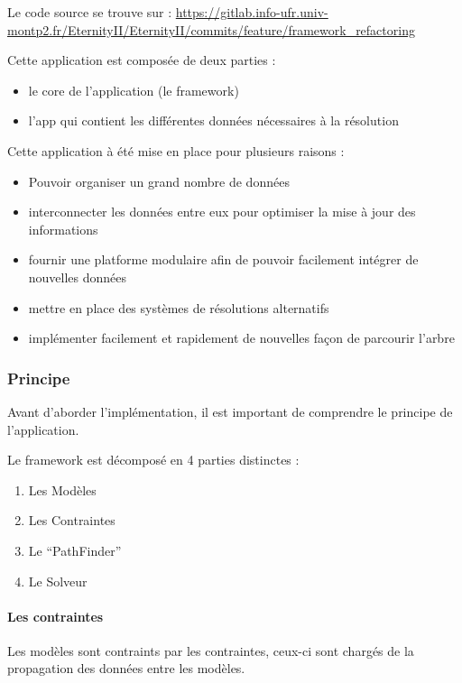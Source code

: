 Le code source se trouve sur : \url{https://gitlab.info-ufr.univ-montp2.fr/EternityII/EternityII/commits/feature/framework_refactoring}

Cette application est composée de deux parties :

\begin{itemize}
	\item le core de l'application (le framework)
	\item l'app qui contient les différentes données nécessaires à la résolution
\end{itemize}

Cette application à été mise en place pour plusieurs raisons :
\begin{itemize}
	\item Pouvoir organiser un grand nombre de données
	\item interconnecter les données entre eux pour optimiser la mise à jour des informations
	\item fournir une platforme modulaire afin de pouvoir facilement intégrer de nouvelles données
	\item mettre en place des systèmes de résolutions alternatifs
	\item implémenter facilement et rapidement de nouvelles façon de parcourir l'arbre
\end{itemize}

\subsubsection{Principe}

Avant d'aborder l'implémentation, il est important de comprendre le principe de l'application.

Le framework est décomposé en 4 parties distinctes :

\begin{enumerate}
	\item Les Modèles
	\item Les Contraintes
	\item Le \enquote{PathFinder}
	\item Le Solveur
\end{enumerate}


\paragraph{Les contraintes}

Les modèles sont contraints par les contraintes, ceux-ci sont chargés de la propagation des données entre les modèles.

